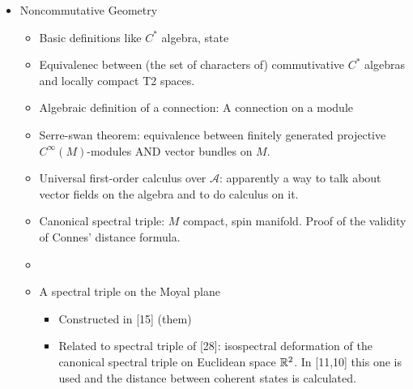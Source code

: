 \documentclass{article}
\begin{document}
\begin{itemize}
\begin{itemize}
\begin{itemize}
            \end{itemize}
            
        \end{itemize}
    
    \item Noncommutative Geometry
    
        \begin{itemize}
        
        \item Basic definitions like $C^*$ algebra, state
        
        \item Equivalenec between (the set of characters of) commutivative $C^*$ algebras and locally compact T2 spaces.
        
        \item Algebraic definition of a connection: A connection on a module
        
        \item Serre-swan theorem: equivalence between finitely generated projective $C^\infty(M)$-modules AND vector bundles on $M$.
        
        \item Universal first-order calculus over $\mathcal A$: apparently a way to talk about vector fields on the algebra and to do calculus on it.
        
        \item Canonical spectral triple: $M$ compact, spin manifold. Proof of the validity of Connes' distance formula.
        
        \item {}
        
        \item A spectral triple on the Moyal plane
        
            \begin{itemize}
                
            \item Constructed in [15] (them)
            
            \item Related to spectral triple of [28]: isospectral deformation of the canonical spectral triple on Euclidean space $\mathbb{R}^2$. In [11,10] this one is used and the distance between coherent states is calculated.
            

\end{itemize}
\end{itemize}
\end{itemize}
\end{document}
